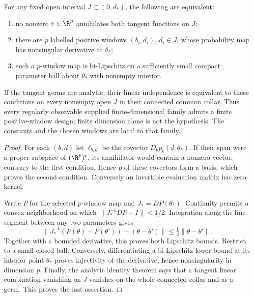 \begin{theorem}
\label{thm:v14-rank}
For any fixed open interval $J\subset(0,d_*)$, the following are
equivalent:
\begin{enumerate}
\item no nonzero $v\in\R^p$ annihilates both tangent functions on $J$;
\item there are $p$ labelled positive windows $(b_i,d_i)$, $d_i\in J$,
whose probability map has nonsingular derivative at $\theta_*$;
\item such a $p$-window map is bi-Lipschitz on a sufficiently small
compact parameter ball about $\theta_*$ with nonempty interior.
\end{enumerate}
If the tangent germs are analytic, their linear independence is
equivalent to these conditions on every nonempty open $J$ in their
connected common collar. Thus every regularly observable supplied
finite-dimensional family admits a finite positive-window design;
finite dimension alone is not the hypothesis. The constants and the
chosen windows are local to that family.
\end{theorem}
\begin{proof}
For each $(b,d)$ let $\ell_{b,d}$ be the covector
$D_\theta p_b(d;\theta_*)$. If their span were a proper subspace of
$(\R^p)^*$, its annihilator would contain a nonzero vector, contrary
to the first condition. Hence $p$ of these covectors form a basis,
which proves the second condition. Conversely an invertible evaluation
matrix has zero kernel.

Write $P$ for the selected $p$-window map and $J_*=DP(\theta_*)$.
Continuity permits a convex neighborhood on which
$\|J_*^{-1}DP-I\|<1/2$. Integration along the line segment between
any two parameters gives
\[
 \|J_*^{-1}(P(\theta)-P(\theta'))-(\theta-\theta')\|
                           \le\tfrac12\|\theta-\theta'\|.
\]
Together with a bounded derivative, this proves both Lipschitz bounds.
Restrict to a small closed ball. Conversely, differentiating a
bi-Lipschitz lower bound at its interior point $\theta_*$ proves
injectivity of the derivative, hence nonsingularity in dimension $p$.
Finally, the analytic identity theorem says that a tangent linear
combination vanishing on $J$ vanishes on the whole connected collar
and as a germ. This proves the last assertion.
\end{proof}

